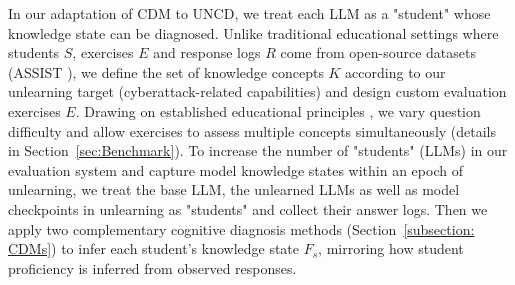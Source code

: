 In our adaptation of CDM to UNCD, we treat each LLM as a "student" whose knowledge state can be diagnosed. Unlike traditional educational settings where students \(S\), exercises \(E\) and response logs \(R\) come from open-source datasets (\eg ASSIST \cite{feng2009addressing}), we define the set of knowledge concepts \(K\) according to our unlearning target (cyberattack-related capabilities) and design custom evaluation exercises \(E\). Drawing on established educational principles \citep{forehand2010bloom}, we vary question difficulty and allow exercises to assess multiple concepts simultaneously (details in Section~\ref{sec:Benchmark}). To increase the number of "students" (LLMs) in our evaluation system and capture model knowledge states within an epoch of unlearning, we treat the base LLM, the unlearned LLMs as well as model checkpoints in unlearning as "students" and collect their answer logs. Then we apply two complementary cognitive diagnosis methods (Section~\ref{subsection: CDMs}) to infer each student’s knowledge state \(F_s\), mirroring how student proficiency is inferred from observed responses.







